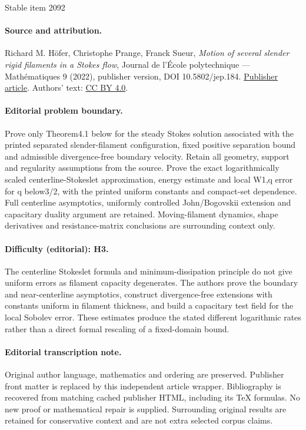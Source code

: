 \documentclass[11pt]{article}
\theoremstyle{definition}
\theoremstyle{remark}
\begin{document}
\begin{center}{\Large Stable item 2092}\end{center}
\paragraph{Source and attribution.}
Richard M. Höfer, Christophe Prange, Franck Sueur, \emph{Motion of several slender rigid filaments in a Stokes flow}, Journal de l’École polytechnique — Mathématiques 9 (2022), publisher version, DOI 10.5802/jep.184. \href{https://jep.centre-mersenne.org/articles/10.5802/jep.184/}{Publisher article}. Authors' text: \href{https://creativecommons.org/licenses/by/4.0/}{CC BY 4.0}.
\paragraph{Editorial problem boundary.}
Prove only Theorem4.1 below for the steady Stokes solution associated with the printed separated slender-filament configuration, fixed positive separation bound and admissible divergence-free boundary velocity. Retain all geometry, support and regularity assumptions from the source. Prove the exact logarithmically scaled centerline-Stokeslet approximation, energy estimate and local W1,q error for q below3/2, with the printed uniform constants and compact-set dependence. Full centerline asymptotics, uniformly controlled John/Bogovskii extension and capacitary duality argument are retained. Moving-filament dynamics, shape derivatives and resistance-matrix conclusions are surrounding context only.
\paragraph{Difficulty (editorial): H3.}
The centerline Stokeslet formula and minimum-dissipation principle do not give uniform errors as filament capacity degenerates. The authors prove the boundary and near-centerline asymptotics, construct divergence-free extensions with constants uniform in filament thickness, and build a capacitary test field for the local Sobolev error. These estimates produce the stated different logarithmic rates rather than a direct formal rescaling of a fixed-domain bound.
\paragraph{Editorial transcription note.}
Original author language, mathematics and ordering are preserved. Publisher front matter is replaced by this independent article wrapper. Bibliography is recovered from matching cached publisher HTML, including its TeX formulas. No new proof or mathematical repair is supplied. Surrounding original results are retained for conservative context and are not extra selected corpus claims.
\clearpage
\end{document}
